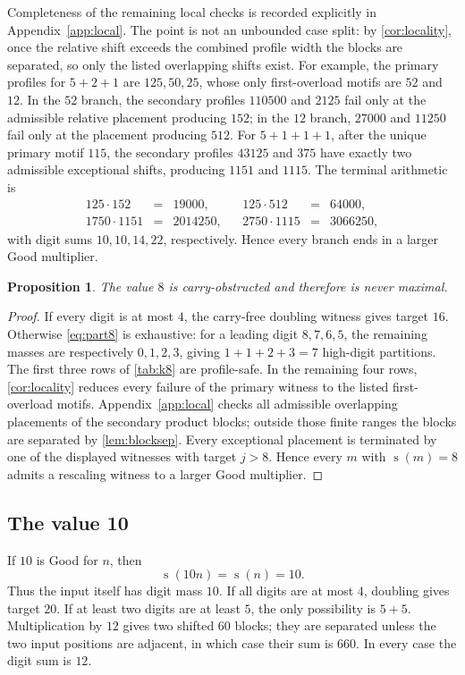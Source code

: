 \documentclass[11pt]{article}
\newtheorem{proposition}[theorem]{Proposition}
\newcommand{\ds}{\operatorname{s}}
\begin{document}
Completeness of the remaining local checks is recorded explicitly in Appendix~\ref{app:local}.  The point is not an unbounded case split: by \cref{cor:locality}, once the relative shift exceeds the combined profile width the blocks are separated, so only the listed overlapping shifts exist.  For example, the primary profiles for $5+2+1$ are $125,50,25$, whose only first-overload motifs are $52$ and $12$.  In the $52$ branch, the secondary profiles $110500$ and $2125$ fail only at the admissible relative placement producing $152$; in the $12$ branch, $27000$ and $11250$ fail only at the placement producing $512$.  For $5+1+1+1$, after the unique primary motif $115$, the secondary profiles $43125$ and $375$ have exactly two admissible exceptional shifts, producing $1151$ and $1115$.  The terminal arithmetic is
\[
\begin{array}{rclcrcl}
125\cdot152&=&19000,&&125\cdot512&=&64000,\\
1750\cdot1151&=&2014250,&&2750\cdot1115&=&3066250,
\end{array}
\]
with digit sums $10,10,14,22$, respectively.  Hence every branch ends in a larger Good multiplier.

\begin{proposition}\label{prop:not8}
The value $8$ is carry-obstructed and therefore is never maximal.
\end{proposition}

\begin{proof}
If every digit is at most $4$, the carry-free doubling witness gives target $16$.  Otherwise \eqref{eq:part8} is exhaustive: for a leading digit $8,7,6,5$, the remaining masses are respectively $0,1,2,3$, giving $1+1+2+3=7$ high-digit partitions.  The first three rows of \cref{tab:k8} are profile-safe.  In the remaining four rows, \cref{cor:locality} reduces every failure of the primary witness to the listed first-overload motifs.  Appendix~\ref{app:local} checks all admissible overlapping placements of the secondary product blocks; outside those finite ranges the blocks are separated by \cref{lem:blocksep}.  Every exceptional placement is terminated by one of the displayed witnesses with target $j>8$.  Hence every $m$ with $\ds(m)=8$ admits a rescaling witness to a larger Good multiplier.
\end{proof}

\subsection{The value 10}
If $10$ is Good for $n$, then
\[
  \ds(10n)=\ds(n)=10.
\]
Thus the input itself has digit mass $10$.  If all digits are at most $4$, doubling gives target $20$.  If at least two digits are at least $5$, the only possibility is $5+5$.  Multiplication by $12$ gives two shifted $60$ blocks; they are separated unless the two input positions are adjacent, in which case their sum is $660$.  In every case the digit sum is $12$.
\end{document}
